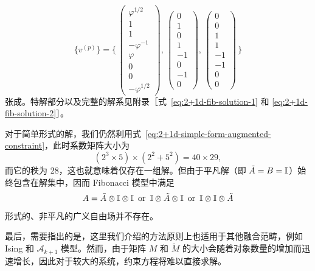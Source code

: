 \begin{equation}
  \{ v^{(p)} \} = \Biggl\{ \,
    \begin{pmatrix} \varphi^{1/2} \\ 1 \\ 1 \\ -\varphi^{-1} \\ \varphi \\ 0 \\ 0 \\ -\varphi^{1/2} \end{pmatrix}, \,
    \begin{pmatrix} 0 \\ 1 \\ 0 \\ 1 \\ -1 \\  0 \\ -1 \\ 0 \end{pmatrix}, \,
    \begin{pmatrix} 0 \\ 0 \\ 1 \\ 1 \\ -1 \\ -1 \\  0 \\ 0 \end{pmatrix} \,
  \Biggr\}
  \label{eq:2+1d-fib-null-space}
\end{equation}
张成。特解部分以及完整的解系见附录［式~\eqref{eq:2+1d-fib-solution-1} 和 \eqref{eq:2+1d-fib-solution-2}］。

对于简单形式的解，我们仍然利用式~\eqref{eq:2+1d-simple-form-augmented-constraint}，此时系数矩阵大小为
\begin{equation}
  (2^3 \times 5) \times (2^2 + 5^2) = 40 \times 29,
\end{equation}
而它的秩为 28，这也就意味着仅存在一组解。但由于平凡解（即 $\tilde{A}=B=\mathbb{I}$）始终包含在解集中，因而 Fibonacci 模型中满足
\begin{equation}
  A = \tilde{A} \otimes \mathbb{I} \otimes \mathbb{I} \enspace \text{or} \enspace
      \mathbb{I} \otimes \tilde{A} \otimes \mathbb{I} \enspace \text{or} \enspace
      \mathbb{I} \otimes \mathbb{I} \otimes \tilde{A}
\end{equation}
形式的、非平凡的广义自由场并不存在。

最后，需要指出的是，这里我们介绍的方法原则上也适用于其他融合范畴，例如 Ising 和 $\mathcal{A}_{k+1}$ 模型。然而，由于矩阵 $M$ 和 $\tilde{M}$ 的大小会随着对象数量的增加而迅速增长，因此对于较大的系统，约束方程将难以直接求解。

